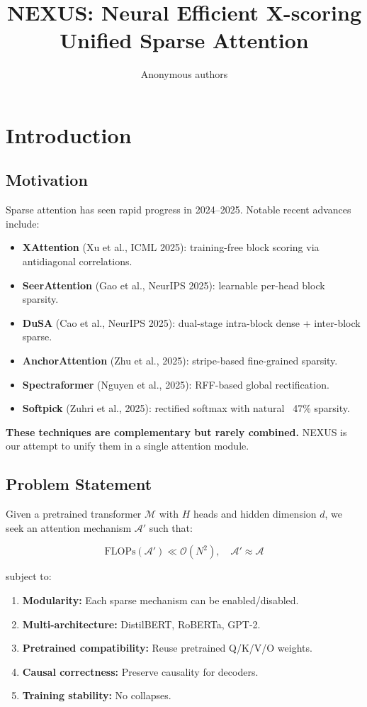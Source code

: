 \title{\textbf{NEXUS: Neural Efficient X-scoring Unified Sparse Attention}}

\author{Anonymous authors}


\section{Introduction}

\subsection{Motivation}

Sparse attention has seen rapid progress in 2024--2025. Notable recent 
advances include:

\begin{itemize}
\item \textbf{XAttention} (Xu et al., ICML 2025): training-free block scoring via
  antidiagonal correlations.
\item \textbf{SeerAttention} (Gao et al., NeurIPS 2025): learnable per-head block
  sparsity.
\item \textbf{DuSA} (Cao et al., NeurIPS 2025): dual-stage intra-block dense +
  inter-block sparse.
\item \textbf{AnchorAttention} (Zhu et al., 2025): stripe-based fine-grained sparsity.
\item \textbf{Spectraformer} (Nguyen et al., 2025): RFF-based global rectification.
\item \textbf{Softpick} (Zuhri et al., 2025): rectified softmax with natural ~47\%
  sparsity.

\end{itemize}
\textbf{These techniques are complementary but rarely combined.} NEXUS is our 
attempt to unify them in a single attention module.

\subsection{Problem Statement}

Given a pretrained transformer $\mathcal{M}$ with $H$ heads and hidden 
dimension $d$, we seek an attention mechanism $\mathcal{A}'$ such that:

\[
\text{FLOPs}(\mathcal{A}') \ll \mathcal{O}(N^2), \quad
\mathcal{A}' \approx \mathcal{A}
\tag{1.1}
\]

subject to:

\begin{enumerate}
\item \textbf{Modularity:} Each sparse mechanism can be enabled/disabled.
\item \textbf{Multi-architecture:} DistilBERT, RoBERTa, GPT-2.
\item \textbf{Pretrained compatibility:} Reuse pretrained Q/K/V/O weights.
\item \textbf{Causal correctness:} Preserve causality for decoders.
\item \textbf{Training stability:} No collapses.

\end{enumerate}
